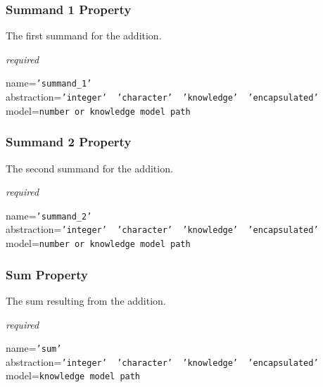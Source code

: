 \subsubsection{Summand 1 Property}

The first summand for the addition.

\emph{required}

name=\texttt{'summand\_1'}\\
abstraction=\texttt{'integer' \vline\ 'character' \vline\ 'knowledge' \vline\ 'encapsulated'}\\
model=\texttt{number or knowledge model path}

\subsubsection{Summand 2 Property}

The second summand for the addition.

\emph{required}

name=\texttt{'summand\_2'}\\
abstraction=\texttt{'integer' \vline\ 'character' \vline\ 'knowledge' \vline\ 'encapsulated'}\\
model=\texttt{number or knowledge model path}

\subsubsection{Sum Property}

The sum resulting from the addition.

\emph{required}

name=\texttt{'sum'}\\
abstraction=\texttt{'integer' \vline\ 'character' \vline\ 'knowledge' \vline\ 'encapsulated'}\\
model=\texttt{knowledge model path}

